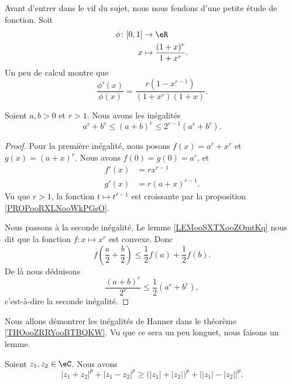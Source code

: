 Avant d'entrer dans le vif du sujet, nous nous fendons d'une petite étude de fonction. Soit
\begin{equation}
    \begin{aligned}
        \phi\colon \mathopen[ 0 , 1 \mathclose]&\to \eR \\
        x&\mapsto \frac{ (1+x)^r }{ 1+x^r }. 
    \end{aligned}
\end{equation}
Un peu de calcul montre que
\begin{equation}
    \frac{ \phi'(x) }{ \phi(x) }=\frac{ r(1-x^{r-1}) }{ (1+x^r)(1+x) }.
\end{equation}

\begin{lemma}       \label{LEMooFKKEooDTypUd}
    Soient \( a,b>0\) et \( r>1\). Nous avons les inégalités
    \begin{equation}
        a^r+b^r\leq (a+b)^r\leq 2^{r-1}(a^r+b^r).
    \end{equation}
\end{lemma}

\begin{proof}
    Pour la première inégalité, nous posons \( f(x)=a^r+x^r\) et \( g(x)=(a+x)^r\). Nous avons \( f(0)=g(0)=a^r\), et
    \begin{subequations}
        \begin{align}
            f'(x)&=rx^{r-1}\\
            g'(x)&=r(a+x)^{r-1}.
        \end{align}
    \end{subequations}
    Vu que \( r>1\), la fonction \( t\mapsto t^{r-1}\) est croissante par la proposition \ref{PROPooRXLNooWkPGsO}.

    Nous passons à la seconde inégalité. Le lemme \ref{LEMooSXTXooZOmtKq} nous dit que la fonction \( f\colon x\mapsto x^r \) est convexe. Donc
    \begin{equation}
        f\left( \frac{ a }{2}+\frac{ b }{2} \right)\leq\frac{ 1 }{2}f(a)+\frac{ 1 }{2}f(b).
    \end{equation}
    De là nous déduisons
    \begin{equation}
        \frac{ (a+b)^r }{ 2^r }\leq \frac{ 1 }{2}(a^r+b^r),
    \end{equation}
    c'est-à-dire la seconde inégalité.
\end{proof}

Nous allons démontrer les inégalités de Hanner dans le théorème \ref{THOooZRRYooBTBQKW}. Vu que ce sera un peu longuet, nous faisons un lemme.
\begin{lemma}       \label{LEMooDHRCooQiSpyC}
    Soient \( z_1,z_2\in \eC\). Nous avons
    \begin{equation}        \label{EQooMUXVooSpGSyG}
        | z_1+z_2 |^p+| z_1-z_2 |^p\geq \big( | z_1 |+| z_2 | \big)^p+\big| | z_1 |-| z_2 | \big|^p.
    \end{equation}
\end{lemma}

